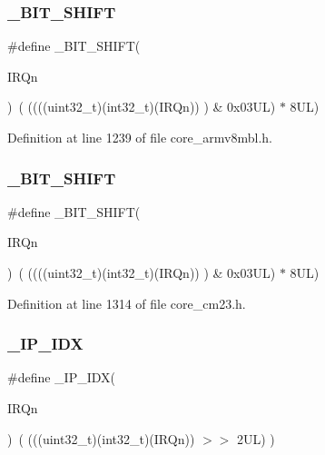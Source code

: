 \subsubsection{\texorpdfstring{\+\_\+\+B\+I\+T\+\_\+\+S\+H\+I\+FT}{\_BIT\_SHIFT}\hspace{0.1cm}{\footnotesize\ttfamily [5/6]}}
{\footnotesize\ttfamily \#define \+\_\+\+B\+I\+T\+\_\+\+S\+H\+I\+FT(\begin{DoxyParamCaption}\item[{}]{I\+R\+Qn }\end{DoxyParamCaption})~(  ((((uint32\+\_\+t)(int32\+\_\+t)(I\+R\+Qn))         )      \&  0x03\+U\+L) $\ast$ 8\+U\+L)}



Definition at line 1239 of file core\+\_\+armv8mbl.\+h.

\mbox{\label{group___c_m_s_i_s___core___n_v_i_c_functions_ga53c75b28823441c6153269f0ecbed878}} 
\subsubsection{\texorpdfstring{\+\_\+\+B\+I\+T\+\_\+\+S\+H\+I\+FT}{\_BIT\_SHIFT}\hspace{0.1cm}{\footnotesize\ttfamily [6/6]}}
{\footnotesize\ttfamily \#define \+\_\+\+B\+I\+T\+\_\+\+S\+H\+I\+FT(\begin{DoxyParamCaption}\item[{}]{I\+R\+Qn }\end{DoxyParamCaption})~(  ((((uint32\+\_\+t)(int32\+\_\+t)(I\+R\+Qn))         )      \&  0x03\+U\+L) $\ast$ 8\+U\+L)}



Definition at line 1314 of file core\+\_\+cm23.\+h.

\mbox{\label{group___c_m_s_i_s___core___n_v_i_c_functions_ga370ec4b1751a6a889d849747df3763a9}} 
\subsubsection{\texorpdfstring{\+\_\+\+I\+P\+\_\+\+I\+DX}{\_IP\_IDX}\hspace{0.1cm}{\footnotesize\ttfamily [1/6]}}
{\footnotesize\ttfamily \#define \+\_\+\+I\+P\+\_\+\+I\+DX(\begin{DoxyParamCaption}\item[{}]{I\+R\+Qn }\end{DoxyParamCaption})~(   (((uint32\+\_\+t)(int32\+\_\+t)(I\+R\+Qn))                $>$$>$    2\+U\+L)      )}



